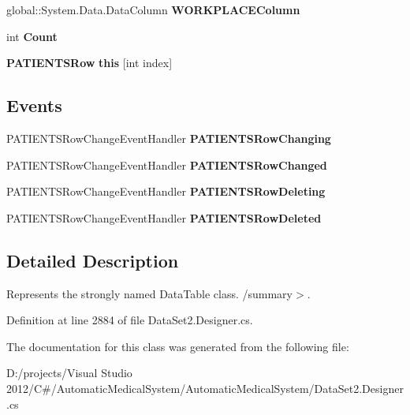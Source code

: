 \begin{CompactItemize}
\item 
global::System.Data.DataColumn \textbf{WORKPLACEColumn}\hspace{0.3cm}{\tt  [get]}\label{class_automatic_medical_system_1_1_data_set2_1_1_p_a_t_i_e_n_t_s_data_table_636d44cf494f3b2b6d22c1fe5e366fe6}

\item 
int \textbf{Count}\hspace{0.3cm}{\tt  [get]}\label{class_automatic_medical_system_1_1_data_set2_1_1_p_a_t_i_e_n_t_s_data_table_c266ab1ed6574ecf2ae17798df8488da}

\item 
{\bf PATIENTSRow} \textbf{this} [int index]\hspace{0.3cm}{\tt  [get]}\label{class_automatic_medical_system_1_1_data_set2_1_1_p_a_t_i_e_n_t_s_data_table_cb318e717decd43baafd8b4bd663dc88}

\end{CompactItemize}
\subsection*{Events}
\begin{CompactItemize}
\item 
PATIENTSRowChangeEventHandler \textbf{PATIENTSRowChanging}\label{class_automatic_medical_system_1_1_data_set2_1_1_p_a_t_i_e_n_t_s_data_table_41de2f387c345696bb5795ac4b2324f8}

\item 
PATIENTSRowChangeEventHandler \textbf{PATIENTSRowChanged}\label{class_automatic_medical_system_1_1_data_set2_1_1_p_a_t_i_e_n_t_s_data_table_0b7321ea4d17a8e47d212fe6e3e8bb6e}

\item 
PATIENTSRowChangeEventHandler \textbf{PATIENTSRowDeleting}\label{class_automatic_medical_system_1_1_data_set2_1_1_p_a_t_i_e_n_t_s_data_table_611e40dc28a8ab7f441a71f45e0a58be}

\item 
PATIENTSRowChangeEventHandler \textbf{PATIENTSRowDeleted}\label{class_automatic_medical_system_1_1_data_set2_1_1_p_a_t_i_e_n_t_s_data_table_8df2cb2b30194025ff53de5d4fa04f2f}

\end{CompactItemize}


\subsection{Detailed Description}
Represents the strongly named DataTable class. /summary$>$. 

Definition at line 2884 of file DataSet2.Designer.cs.

The documentation for this class was generated from the following file:\begin{CompactItemize}
\item 
D:/projects/Visual Studio 2012/C\#/AutomaticMedicalSystem/AutomaticMedicalSystem/DataSet2.Designer.cs\end{CompactItemize}
